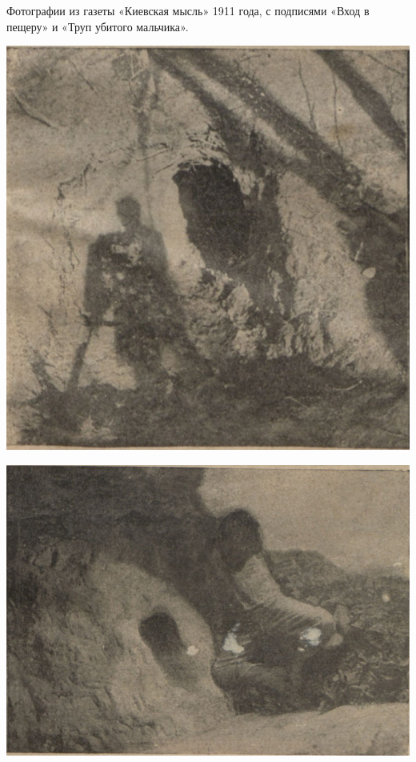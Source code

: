 
Фотографии из газеты «Киевская мысль» 1911 года, с подписями «Вход в пещеру» и «Труп убитого мальчика».

\begin{center}
\includegraphics[width=0.85\linewidth]{chast-kirvys/beylis/1911-by-01.jpg}
\end{center}

\begin{center}
\includegraphics[width=0.85\linewidth]{chast-kirvys/beylis/1911-by-02.jpg}
\end{center}

\newpage

